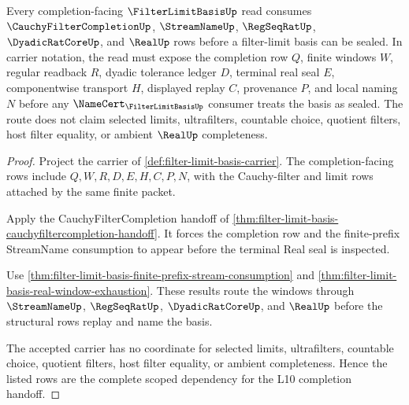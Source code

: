 \begin{theorem}\label{thm:filterlimitbasis-scoped-dependency}
Every completion-facing $\FilterLimitBasisUp$ read consumes $\CauchyFilterCompletionUp$, $\StreamNameUp$, $\RegSeqRatUp$, $\DyadicRatCoreUp$, and $\RealUp$ rows before a filter-limit basis can be sealed. In carrier notation, the read must expose the completion row $Q$, finite windows $W$, regular readback $R$, dyadic tolerance ledger $D$, terminal real seal $E$, componentwise transport $H$, displayed replay $C$, provenance $P$, and local naming $N$ before any $\NameCert_{\FilterLimitBasisUp}$ consumer treats the basis as sealed. The route does not claim selected limits, ultrafilters, countable choice, quotient filters, host filter equality, or ambient $\RealUp$ completeness.
\end{theorem}
\begin{proof}
Project the carrier of \autoref{def:filter-limit-basis-carrier}. The completion-facing rows include $Q,W,R,D,E,H,C,P,N$, with the Cauchy-filter and limit rows attached by the same finite packet.

Apply the CauchyFilterCompletion handoff of \autoref{thm:filter-limit-basis-cauchyfiltercompletion-handoff}. It forces the completion row and the finite-prefix StreamName consumption to appear before the terminal Real seal is inspected.

Use \autoref{thm:filter-limit-basis-finite-prefix-stream-consumption} and \autoref{thm:filter-limit-basis-real-window-exhaustion}. These results route the windows through $\StreamNameUp$, $\RegSeqRatUp$, $\DyadicRatCoreUp$, and $\RealUp$ before the structural rows replay and name the basis.

The accepted carrier has no coordinate for selected limits, ultrafilters, countable choice, quotient filters, host filter equality, or ambient completeness. Hence the listed rows are the complete scoped dependency for the L10 completion handoff.
\end{proof}

